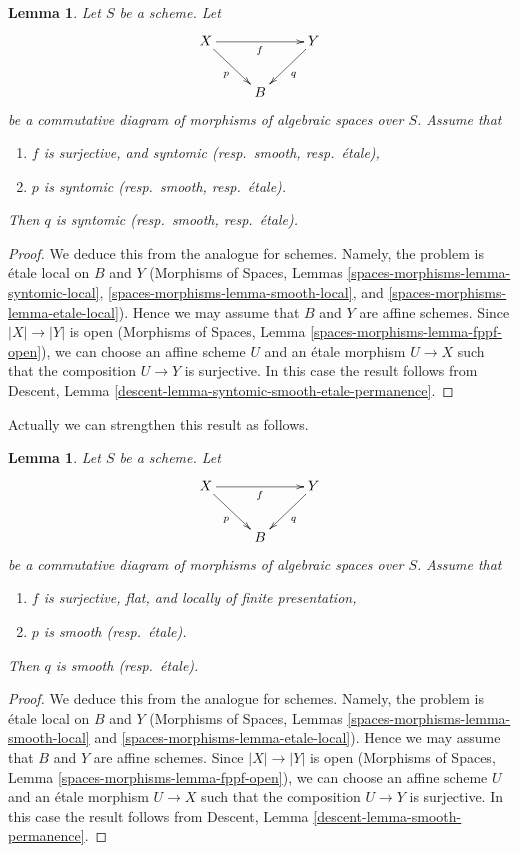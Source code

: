 \documentclass{stacks-project}
\theoremstyle{plain}
\newtheorem{lemma}[subsection]{Lemma}
\theoremstyle{definition}
\theoremstyle{remark}
\numberwithin{equation}{subsection}
\begin{document}
\begin{lemma}
\label{lemma-syntomic-smooth-etale-permanence}
Let $S$ be a scheme. Let
$$
\xymatrix{
X \ar[rr]_f \ar[rd]_p & &
Y \ar[dl]^q \\
& B
}
$$
be a commutative diagram of morphisms of algebraic spaces over $S$.
Assume that
\begin{enumerate}
\item $f$ is surjective, and syntomic (resp.\ smooth, resp.\ \'etale),
\item $p$ is syntomic (resp.\ smooth, resp.\ \'etale).
\end{enumerate}
Then $q$ is syntomic (resp.\ smooth, resp.\ \'etale).
\end{lemma}

\begin{proof}
We deduce this from the analogue for schemes.
Namely, the problem is \'etale local on $B$ and $Y$
(Morphisms of Spaces, Lemmas
\ref{spaces-morphisms-lemma-syntomic-local},
\ref{spaces-morphisms-lemma-smooth-local}, and
\ref{spaces-morphisms-lemma-etale-local}).
Hence we may assume that $B$ and $Y$ are affine
schemes. Since $|X| \to |Y|$ is open
(Morphisms of Spaces, Lemma \ref{spaces-morphisms-lemma-fppf-open}),
we can choose an affine
scheme $U$ and an \'etale morphism $U \to X$ such that the
composition $U \to Y$ is surjective. In this case the result
follows from Descent, Lemma
\ref{descent-lemma-syntomic-smooth-etale-permanence}.
\end{proof}

\noindent
Actually we can strengthen this result as follows.

\begin{lemma}
\label{lemma-smooth-permanence}
Let $S$ be a scheme. Let
$$
\xymatrix{
X \ar[rr]_f \ar[rd]_p & &
Y \ar[dl]^q \\
& B
}
$$
be a commutative diagram of morphisms of algebraic spaces over $S$. Assume that
\begin{enumerate}
\item $f$ is surjective, flat, and locally of finite presentation,
\item $p$ is smooth (resp.\ \'etale).
\end{enumerate}
Then $q$ is smooth (resp.\ \'etale).
\end{lemma}

\begin{proof}
We deduce this from the analogue for schemes.
Namely, the problem is \'etale local on $B$ and $Y$
(Morphisms of Spaces, Lemmas
\ref{spaces-morphisms-lemma-smooth-local} and
\ref{spaces-morphisms-lemma-etale-local}).
Hence we may assume that $B$ and $Y$ are affine
schemes. Since $|X| \to |Y|$ is open
(Morphisms of Spaces, Lemma \ref{spaces-morphisms-lemma-fppf-open}),
we can choose an affine
scheme $U$ and an \'etale morphism $U \to X$ such that the
composition $U \to Y$ is surjective. In this case the result
follows from Descent, Lemma
\ref{descent-lemma-smooth-permanence}.
\end{proof}
\end{document}
